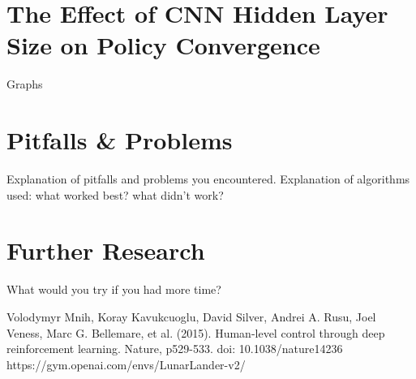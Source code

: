 \documentclass[conference]{IEEEtran}
\begin{document}
\section{The Effect of CNN Hidden Layer Size on Policy Convergence}
Graphs

\section{Pitfalls \& Problems}
Explanation of pitfalls and problems you encountered.
Explanation of algorithms used: what worked best? what didn’t work?

\section{Further Research}
What would you try if you had more time?

\begin{thebibliography}{00}
 Volodymyr Mnih, Koray Kavukcuoglu, David Silver, Andrei A. Rusu, Joel Veness, Marc G. Bellemare, et al. (2015). Human-level control through deep reinforcement learning. Nature, p529-533. doi: 10.1038/nature14236
 https://gym.openai.com/envs/LunarLander-v2/
\end{thebibliography}
\end{document}
